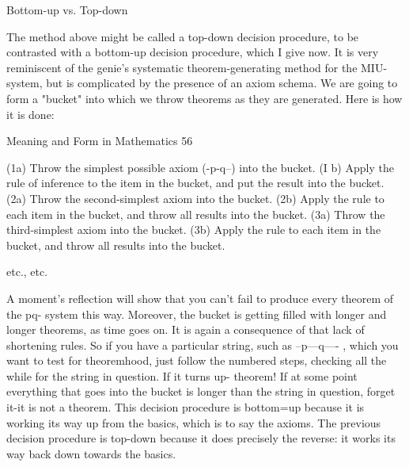                               Bottom-up vs. Top-down

The method above might be called a top-down decision procedure, to be contrasted with a
bottom-up decision procedure, which I give now. It is very reminiscent of the genie's
systematic theorem-generating method for the MIU-system, but is complicated by the
presence of an axiom schema. We are going to form a "bucket" into which we throw
theorems as they are generated. Here is how it is done:




Meaning and Form in Mathematics                                                           56

(1a) Throw the simplest possible axiom (-p-q--) into the bucket.
(I b) Apply the rule of inference to the item in the bucket, and put the result into the
   bucket.
(2a) Throw the second-simplest axiom into the bucket.
(2b) Apply the rule to each item in the bucket, and throw all results into the bucket.
(3a) Throw the third-simplest axiom into the bucket.
(3b) Apply the rule to each item in the bucket, and throw all results into the bucket.

   etc., etc.

A moment's reflection will show that you can't fail to produce every theorem of the pq-
system this way. Moreover, the bucket is getting filled with longer and longer theorems,
as time goes on. It is again a consequence of that lack of shortening rules. So if you have
a particular string, such as --p---q---- , which you want to test for theoremhood, just
follow the numbered steps, checking all the while for the string in question. If it turns up-
theorem! If at some point everything that goes into the bucket is longer than the string in
question, forget it-it is not a theorem. This decision procedure is bottom=up because it is
working its way up from the basics, which is to say the axioms. The previous decision
procedure is top-down because it does precisely the reverse: it works its way back down
towards the basics.

